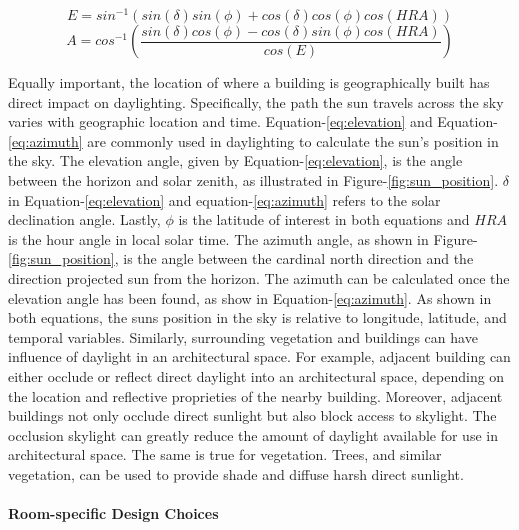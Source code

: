 \begin{equation} \label{eq:elevation}
E = sin^{-1}(sin(\delta) sin(\phi) + cos(\delta) cos(\phi) cos(HRA))
\end{equation}
\begin{equation} \label{eq:azimuth}
A = cos^{-1}( \frac{sin(\delta) cos(\phi) - cos(\delta) sin(\phi) cos(HRA)}{cos(E)})
\end{equation}

Equally important, the location of where a building is geographically built has direct impact on daylighting.  Specifically, the path the sun travels across the sky varies with geographic location and time.  Equation-\ref{eq:elevation} and Equation-\ref{eq:azimuth} are commonly used in daylighting to calculate the sun's position in the sky.  The elevation angle, given by Equation-\ref{eq:elevation}, is the angle between the horizon and solar zenith, as illustrated in Figure-\ref{fig:sun_position}.  $\delta$ in  Equation-\ref{eq:elevation} and equation-\ref{eq:azimuth} refers to the solar declination angle.  Lastly, $\phi$ is the latitude of interest in both equations and $HRA$ is the hour angle in local solar time.  The azimuth angle, as shown in Figure-\ref{fig:sun_position}, is the angle between the cardinal north direction and the direction projected sun from the horizon. The azimuth can be calculated once the elevation angle has been found, as show in Equation-\ref{eq:azimuth}.  As shown in both equations, the suns position in the sky is relative to longitude, latitude, and temporal variables.  Similarly, surrounding vegetation and buildings can have influence of daylight in an architectural space.  For example, adjacent building can either occlude or reflect direct daylight into an architectural space, depending on the location and reflective proprieties of the nearby building.  Moreover, adjacent buildings not only occlude direct sunlight but also block access to skylight.  The occlusion skylight can greatly reduce the amount of daylight available for use in architectural space.  The same is true for vegetation. Trees, and similar vegetation, can be used to provide shade and diffuse harsh direct sunlight. \\

\paragraph{Room-specific Design Choices} 

